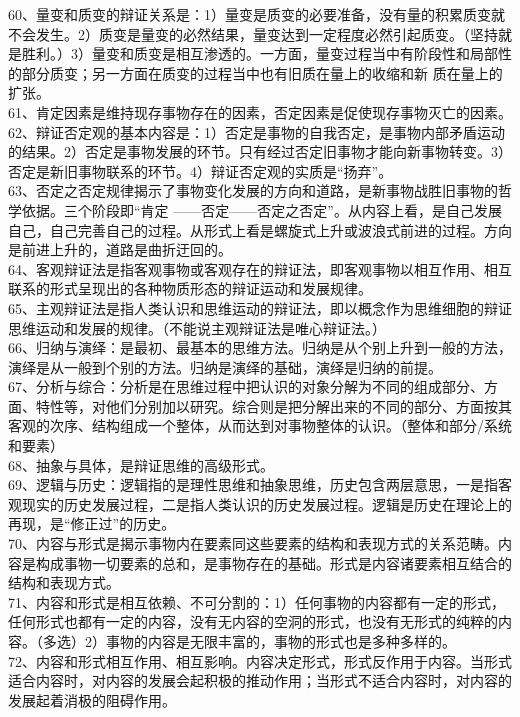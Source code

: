 \documentclass[a4paper,fleqn]{article}
\begin{document}
60、量变和质变的辩证关系是：1）量变是质变的必要准备，没有量的积累质变就不会发生。2）质变是量变的必然结果，量变达到一定程度必然引起质变。（坚持就是胜利。）3）量变和质变是相互渗透的。一方面，量变过程当中有阶段性和局部性的部分质变；另一方面在质变的过程当中也有旧质在量上的收缩和新 质在量上的扩张。 \\
61、肯定因素是维持现存事物存在的因素，否定因素是促使现存事物灭亡的因素。 \\
62、辩证否定观的基本内容是：1）否定是事物的自我否定，是事物内部矛盾运动的结果。2）否定是事物发展的环节。只有经过否定旧事物才能向新事物转变。3）否定是新旧事物联系的环节。4）辩证否定观的实质是“扬弃”。 \\
63、否定之否定规律揭示了事物变化发展的方向和道路，是新事物战胜旧事物的哲学依据。三个阶段即“肯定 ——否定——否定之否定”。从内容上看，是自己发展自己，自己完善自己的过程。从形式上看是螺旋式上升或波浪式前进的过程。方向是前进上升的，道路是曲折迂回的。\\
64、客观辩证法是指客观事物或客观存在的辩证法，即客观事物以相互作用、相互联系的形式呈现出的各种物质形态的辩证运动和发展规律。 \\
65、主观辩证法是指人类认识和思维运动的辩证法，即以概念作为思维细胞的辩证思维运动和发展的规律。（不能说主观辩证法是唯心辩证法。） \\
66、归纳与演绎：是最初、最基本的思维方法。归纳是从个别上升到一般的方法，演绎是从一般到个别的方法。归纳是演绎的基础，演绎是归纳的前提。 \\
67、分析与综合：分析是在思维过程中把认识的对象分解为不同的组成部分、方面、特性等，对他们分别加以研究。综合则是把分解出来的不同的部分、方面按其客观的次序、结构组成一个整体，从而达到对事物整体的认识。（整体和部分/系统和要素） \\
68、抽象与具体，是辩证思维的高级形式。 \\
69、逻辑与历史：逻辑指的是理性思维和抽象思维，历史包含两层意思，一是指客观现实的历史发展过程，二是指人类认识的历史发展过程。逻辑是历史在理论上的再现，是“修正过”的历史。 \\
70、内容与形式是揭示事物内在要素同这些要素的结构和表现方式的关系范畴。内容是构成事物一切要素的总和，是事物存在的基础。形式是内容诸要素相互结合的结构和表现方式。 \\
71、内容和形式是相互依赖、不可分割的：1）任何事物的内容都有一定的形式，任何形式也都有一定的内容，没有无内容的空洞的形式，也没有无形式的纯粹的内容。（多选）2）事物的内容是无限丰富的，事物的形式也是多种多样的。 \\
72、内容和形式相互作用、相互影响。内容决定形式，形式反作用于内容。当形式适合内容时，对内容的发展会起积极的推动作用；当形式不适合内容时，对内容的发展起着消极的阻碍作用。 \\
\end{document}
